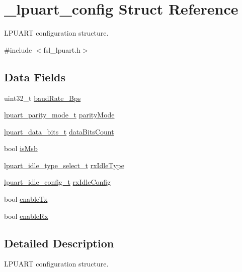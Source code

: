 \hypertarget{struct__lpuart__config}{}\section{\+\_\+lpuart\+\_\+config Struct Reference}
\label{struct__lpuart__config}


L\+P\+U\+A\+RT configuration structure.  




{\ttfamily \#include $<$fsl\+\_\+lpuart.\+h$>$}

\subsection*{Data Fields}
\begin{DoxyCompactItemize}
\item 
uint32\+\_\+t \mbox{\hyperlink{struct__lpuart__config_aa5df547b4cb95d3c959373cf6fa672b5}{baud\+Rate\+\_\+\+Bps}}
\item 
\mbox{\hyperlink{group__lpuart__driver_gab5b7fa64ce57a2f68327e745f4a3e0b2}{lpuart\+\_\+parity\+\_\+mode\+\_\+t}} \mbox{\hyperlink{struct__lpuart__config_a12a3b03bf71728c9d45a5c5c59bdcf94}{parity\+Mode}}
\item 
\mbox{\hyperlink{group__lpuart__driver_gad36b5360ffc95732471dab9bd8f74c3b}{lpuart\+\_\+data\+\_\+bits\+\_\+t}} \mbox{\hyperlink{struct__lpuart__config_a510ee8598e5be024a8b74881f3d3ba3d}{data\+Bits\+Count}}
\item 
bool \mbox{\hyperlink{struct__lpuart__config_af9f7a36013824eebc7fc6c7d646f42ce}{is\+Msb}}
\item 
\mbox{\hyperlink{group__lpuart__driver_gad2f95b94d8a055a75e2099e11df4aece}{lpuart\+\_\+idle\+\_\+type\+\_\+select\+\_\+t}} \mbox{\hyperlink{struct__lpuart__config_a71988980c7d5972f2ff951ef1e37eb78}{rx\+Idle\+Type}}
\item 
\mbox{\hyperlink{group__lpuart__driver_ga48780347b56ffcf164d92df6957c8ab4}{lpuart\+\_\+idle\+\_\+config\+\_\+t}} \mbox{\hyperlink{struct__lpuart__config_a953abaccde778e491905c7d37a3e1bed}{rx\+Idle\+Config}}
\item 
bool \mbox{\hyperlink{struct__lpuart__config_a221caf5c134ec8fcee82b8505ee75731}{enable\+Tx}}
\item 
bool \mbox{\hyperlink{struct__lpuart__config_ac6fe4a8b966fb5611f77358b819671b2}{enable\+Rx}}
\end{DoxyCompactItemize}


\subsection{Detailed Description}
L\+P\+U\+A\+RT configuration structure. 

